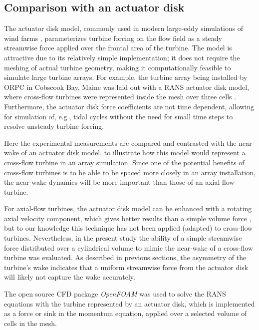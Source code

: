 \subsection{Comparison with an actuator disk}

The actuator disk model, commonly used in modern large-eddy simulations of wind
farms \cite{Stevens2014}, parameterizes turbine forcing on the flow field as a
steady streamwise force applied over the frontal area of the turbine. The model
is attractive due to its relatively simple implementation; it does not require
the meshing of actual turbine geometry, making it computationally feasible to
simulate large turbine arrays. For example, the turbine array being installed by
ORPC in Cobscook Bay, Maine was laid out with a RANS actuator disk model, where
cross-flow turbines were represented inside the mesh over three cells
\cite{Nelson2013}. Furthermore, the actuator disk force coefficients are not
time dependent, allowing for simulation of, e.g., tidal cycles without the need
for small time steps to resolve unsteady turbine forcing.

Here the experimental measurements are compared and contrasted with the
near-wake of an actuator disk model, to illustrate how this model would
represent a cross-flow turbine in an array simulation. Since one of the
potential benefits of cross-flow turbines is to be able to be spaced more
closely in an array installation, the near-wake dynamics will be more important
than those of an axial-flow turbine.

For axial-flow turbines, the actuator disk model can be enhanced with a rotating
axial velocity component, which gives better results than a simple volume force
\cite{Wu2011}, but to our knowledge this technique has not been applied
(adapted) to cross-flow turbines. Nevertheless, in the present study the
ability of a simple streamwise force distributed over a cylindrical volume to
mimic the near-wake of a cross-flow turbine was evaluated. As described in
previous sections, the asymmetry of the turbine's wake indicates that a uniform
streamwise force from the actuator disk will likely not capture the wake
accurately.


The open source CFD package \textit{OpenFOAM} was used to solve the RANS
equations with the turbine represented by an actuator disk, which is
implemented as a force or sink in the momentum equation, applied over a selected
volume of cells in the mesh.

